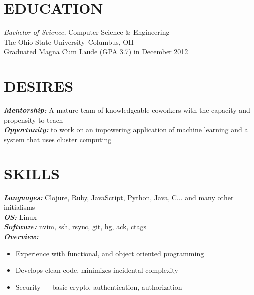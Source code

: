 \documentclass[line,letterpaper]{resume}
\begin{document}
\address{\href{http://www.ryan@ryanmcg.com}{Personal website --- www.ryanmcg.com}}
\address{\href{mailto:ryan@ryanmcg.com}{ryan@ryanmcg.com}}


\begin{resume}
    \vspace{-24pt}
    \section{\uppercase{Education}} {\sl Bachelor of Science,} \/
    Computer Science \& Engineering \\
    The Ohio State University, Columbus, OH \\
    Graduated Magna Cum Laude (GPA 3.7) in December 2012 \\

    \vspace{-20pt}

    \section{\uppercase{Desires}}
    {\sl\textbf{Mentorship:}}\/
    A mature team of knowledgeable coworkers with the capacity and propensity
    to teach \\
    {\sl\textbf{Opportunity:}}\/
    to work on an impowering application of machine learning and a
    system that uses cluster computing
    \vspace{-6pt}
    \section{\uppercase{Skills}}
    {\sl\textbf{Languages:}}\/
    Clojure, Ruby, JavaScript, Python, Java, C... and many other initialisms \\
    {\sl\textbf{OS:}}\/ Linux \\
    {\sl\textbf{Software:}}\/ nvim, ssh, rsync, git, hg, ack, ctags \\
    {\sl\textbf{Overview:}}
    \begin{itemize}
        \item Experience with functional, and object oriented programming
        \item Develops clean code, minimizes incidental complexity
        \item Security --- basic crypto, authentication, authorization
    \end{itemize}

    \vspace{-6pt}


\end{resume}
\end{document}
